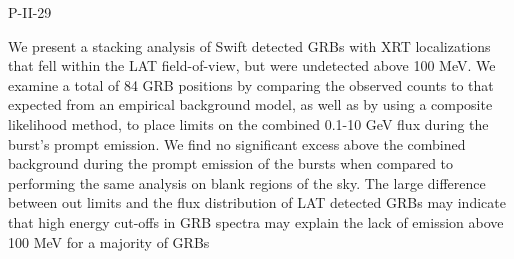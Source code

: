 P-II-29


\bigskip



\bigskip

\noindent We present a stacking analysis of Swift detected GRBs with XRT localizations that fell within the LAT field-of-view, but were undetected above 100 MeV. We examine a total of 84 GRB positions by comparing the observed counts to that expected from an empirical background model, as well as by using a composite likelihood method, to place limits on the combined  0.1-10 GeV flux during the burst's prompt emission. We find no significant excess above the combined background during the prompt emission of the bursts when compared to performing the same analysis on blank regions of the sky. The large difference between out limits and the flux distribution of LAT detected GRBs may indicate that high energy cut-offs in GRB spectra may explain the lack of emission above 100 MeV for a majority of GRBs

